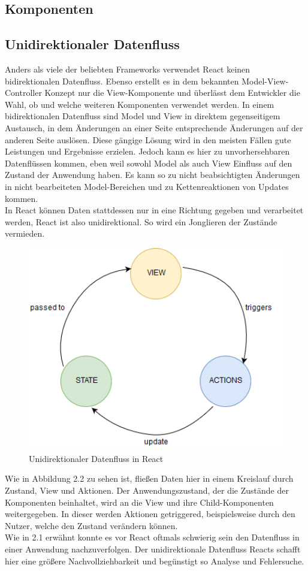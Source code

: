 \subsection{Komponenten}

\subsection{Unidirektionaler Datenfluss}
Anders als viele der beliebten Frameworks verwendet React keinen bidirektionalen Datenfluss. Ebenso erstellt es in dem bekannten Model-View-Controller Konzept nur die View-Komponente und überlässt dem Entwickler die Wahl, ob und welche weiteren Komponenten verwendet werden. In einem bidirektionalen Datenfluss sind Model und View in direktem gegenseitigem Austausch, in dem Änderungen an einer Seite entsprechende Änderungen auf der anderen Seite auslösen. Diese gängige Lösung wird in den meisten Fällen gute Leistungen und Ergebnisse erzielen. Jedoch kann es hier zu unvorhersehbaren Datenflüssen kommen, eben weil sowohl Model als auch View Einfluss auf den Zustand der Anwendung haben. Es kann so zu nicht beabsichtigten Änderungen in nicht bearbeiteten Model-Bereichen und zu Kettenreaktionen von Updates kommen.\\
In React können Daten stattdessen nur in eine Richtung gegeben und verarbeitet werden, React ist also unidirektional. So wird ein Jonglieren der Zustände vermieden. \\
\begin{figure}[H]
     \centerline{\includegraphics[width=12cm]{../Abbildungen/dataflow.png}}
  \caption{Unidirektionaler Datenfluss in React}
  \label{Unidirektionaler Datenfluss in React}
\end{figure}
\noindent Wie in Abbildung 2.2 zu sehen ist, fließen Daten hier in einem Kreislauf durch Zustand, View und Aktionen. Der Anwendungszustand, der die Zustände der Komponenten beinhaltet, wird an die View und ihre Child-Komponenten weitergegeben. In dieser werden Aktionen getriggered, beispielsweise durch den Nutzer, welche den Zustand verändern können. \\
Wie in 2.1 erwähnt konnte es vor React oftmals schwierig sein den Datenfluss in einer Anwendung nachzuverfolgen. Der unidirektionale Datenfluss Reacts schafft hier eine größere Nachvollziehbarkeit und begünstigt so Analyse und Fehlersuche. \\

